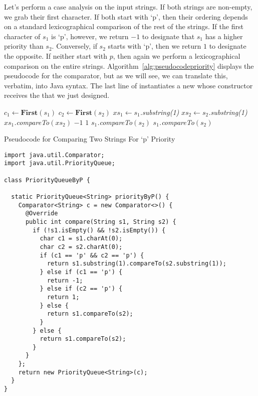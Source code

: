 Let's perform a case analysis on the input strings. If both strings are non-empty, we grab their first character. If both start with `p', then their ordering depends on a standard lexicographical comparison of the rest of the strings. If the first character of $s_1$ is `p', however, we return $-1$ to designate that $s_1$ has a higher priority than $s_2$. Conversely, if $s_2$ starts with `p', then we return $1$ to designate the opposite. If neither start with $p$, then again we perform a lexicographical comparison on the entire strings. Algorithm~\ref{alg:pseudocodepriority} displays the pseudocode for the comparator, but as we will see, we can translate this, verbatim, into Java syntax. The last line of  instantiates a new  whose constructor receives the  that we just designed. 
\begin{algorithm}[H]
\begin{algorithmic}
        \State $c_1 \gets \textbf{First}(s_1)$
        \State $c_2 \gets \textbf{First}(s_2)$
            \State $xs_1 \gets s_1$\emph{.substring(1)}
            \State $xs_2 \gets s_2$\emph{.substring(1)}
            \State \Return $xs_1$\emph{.compareTo}$(xs_2)$
            \State \Return $-1$
            \State \Return $1$
        \Else
            \State \Return $s_1$\emph{.compareTo}$(s_2)$
        \EndIf
    \Else
        \State \Return $s_1$\emph{.compareTo}$(s_2)$
    \EndIf
\EndProcedure
\end{algorithmic}
\caption{Pseudocode for Comparing Two Strings For `p' Priority}
\label{alg:pseudocodeinsertion}
\end{algorithm}

\begin{cl}[]{}
\begin{lstlisting}[language=MyJava]
import java.util.Comparator;
import java.util.PriorityQueue;

class PriorityQueueByP {

  static PriorityQueue<String> priorityByP() {
    Comparator<String> c = new Comparator<>() {
      @Override
      public int compare(String s1, String s2) {
        if (!s1.isEmpty() && !s2.isEmpty()) {
          char c1 = s1.charAt(0);
          char c2 = s2.charAt(0);
          if (c1 == 'p' && c2 == 'p') {
            return s1.substring(1).compareTo(s2.substring(1));
          } else if (c1 == 'p') {
            return -1;
          } else if (c2 == 'p') {
            return 1;
          } else {
            return s1.compareTo(s2);
          }
        } else {
          return s1.compareTo(s2);
        }
      }
    };
    return new PriorityQueue<String>(c);
  }
}
\end{lstlisting}
\end{cl}

